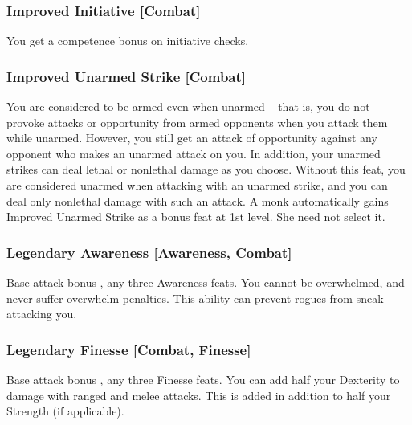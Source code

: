 
\subsubsection{Improved Initiative [Combat]}
 You get a  competence bonus on initiative checks.

\subsubsection{Improved Unarmed Strike [Combat]}
 You are considered to be armed even when unarmed -- that is, you do not provoke attacks or opportunity from armed opponents when you attack them while unarmed. However, you still get an attack of opportunity against any opponent who makes an unarmed attack on you.
In addition, your unarmed strikes can deal lethal or nonlethal damage as you choose.
 Without this feat, you are considered unarmed when attacking with an unarmed strike, and you can deal only nonlethal damage with such an attack.
 A monk automatically gains Improved Unarmed Strike as a bonus feat at 1st level. She need not select it.

\subsubsection{Legendary Awareness [Awareness, Combat]}
\featpre Base attack bonus , any three Awareness feats.
\featben You cannot be overwhelmed, and never suffer overwhelm penalties. This ability can prevent rogues from sneak attacking you.

\subsubsection{Legendary Finesse [Combat, Finesse]}
\featpre Base attack bonus , any three Finesse feats.
\featben You can add half your Dexterity to damage with ranged and melee attacks. This is added in addition to half your Strength (if applicable).

